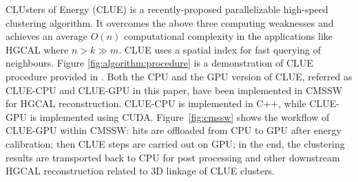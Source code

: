 CLUsters of Energy (CLUE) \cite{cluepaper} is a recently-proposed parallelizable high-speed clustering algorithm. It overcomes the above three computing weaknesses and achieves an average $O(n)$ computational complexity in the applications like HGCAL where $n> k \gg m$. CLUE uses a spatial index \cite{bentley1979data} for fast querying of neighbours. Figure \ref{fig:algorithm:procedure} is a demonstration of CLUE procedure provided in \cite{cluepaper}. Both the CPU and the GPU version of CLUE, referred as CLUE-CPU and CLUE-GPU in this paper, have been implemented in CMSSW for HGCAL reconstruction. CLUE-CPU is implemented in C++, while CLUE-GPU is implemented using CUDA. Figure~\ref{fig:cmssw} shows the workflow of CLUE-GPU within CMSSW: hits are offloaded from CPU to GPU after energy calibration; then CLUE steps are carried out on GPU; in the end, the clustering results are transported back to CPU for post processing and other downstream HGCAL reconstruction related to 3D linkage of CLUE clusters. 



